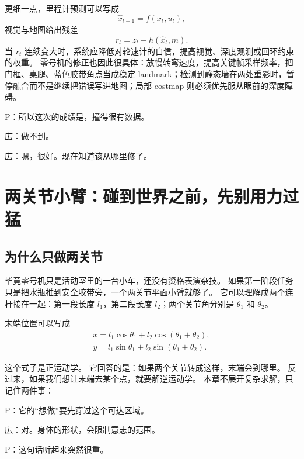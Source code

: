 更细一点，里程计预测可以写成
\begin{equation}
\hat{x}_{t+1}=f(x_t,u_t),
\end{equation}
视觉与地图给出残差
\begin{equation}
r_t=z_t-h(\hat{x}_t,m).
\end{equation}
当 $r_t$ 连续变大时，系统应降低对轮速计的自信，提高视觉、深度观测或回环约束的权重。
零号机的修正也因此很具体：放慢转弯速度，提高关键帧采样频率，把门框、桌腿、蓝色胶带角点当成稳定 landmark；检测到静态墙在两处重影时，暂停融合而不是继续把错误写进地图；局部 costmap 则必须优先服从眼前的深度障碍。

P：所以这次的成绩是，撞得很有数据。

広：做不到。

広：嗯，很好。现在知道该从哪里修了。

\section{两关节小臂：碰到世界之前，先别用力过猛}

\subsection{为什么只做两关节}

毕竟零号机只是活动室里的一台小车，还没有资格表演杂技。
如果第一阶段任务只是把水瓶推到安全胶带旁，一个两关节平面小臂就够了。
它可以理解成两个连杆接在一起：第一段长度 $l_1$，第二段长度 $l_2$；两个关节角分别是 $\theta_1$ 和 $\theta_2$。

末端位置可以写成
\begin{equation}
\begin{array}{l}
x = l_1 \cos \theta_1 + l_2 \cos(\theta_1+\theta_2),\\
y = l_1 \sin \theta_1 + l_2 \sin(\theta_1+\theta_2).
\end{array}
\end{equation}

这个式子是正运动学。
它回答的是：如果两个关节转成这样，末端会到哪里。
反过来，如果我们想让末端去某个点，就要解逆运动学。
本章不展开复杂求解，只记住两件事：


P：它的“想做”要先穿过这个可达区域。

広：对。身体的形状，会限制意志的范围。

P：这句话听起来突然很重。

